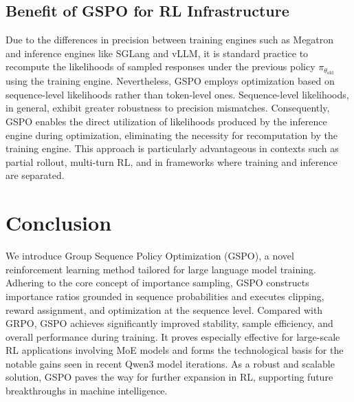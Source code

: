 \subsection{Benefit of GSPO for RL Infrastructure}

Due to the differences in precision between training engines such as Megatron and inference engines like SGLang and vLLM, it is standard practice to recompute the likelihoods of sampled responses under the previous policy $\pi_{\theta_\text{old}}$ using the training engine. Nevertheless, GSPO employs optimization based on sequence-level likelihoods rather than token-level ones. Sequence-level likelihoods, in general, exhibit greater robustness to precision mismatches. Consequently, GSPO enables the direct utilization of likelihoods produced by the inference engine during optimization, eliminating the necessity for recomputation by the training engine. This approach is particularly advantageous in contexts such as partial rollout, multi-turn RL, and in frameworks where training and inference are separated.

\section{Conclusion}

We introduce Group Sequence Policy Optimization (GSPO), a novel reinforcement learning method tailored for large language model training. Adhering to the core concept of importance sampling, GSPO constructs importance ratios grounded in sequence probabilities and executes clipping, reward assignment, and optimization at the sequence level. Compared with GRPO, GSPO achieves significantly improved stability, sample efficiency, and overall performance during training. It proves especially effective for large-scale RL applications involving MoE models and forms the technological basis for the notable gains seen in recent Qwen3 model iterations. As a robust and scalable solution, GSPO paves the way for further expansion in RL, supporting future breakthroughs in machine intelligence.

